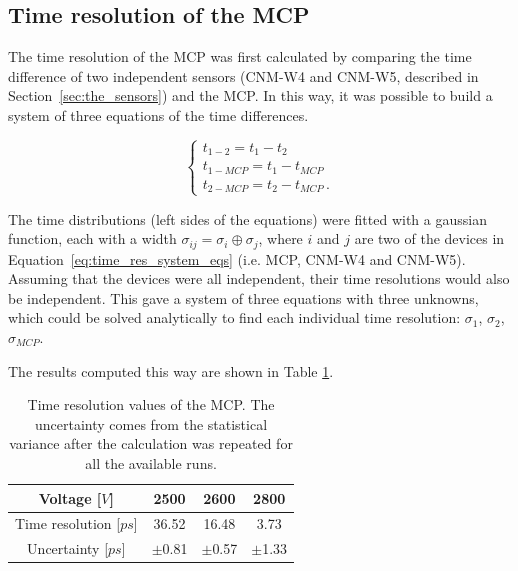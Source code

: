 \subsection{Time resolution of the MCP}
The time resolution of the MCP was first calculated by comparing the time difference of two independent sensors (CNM-W4 and CNM-W5, described in Section~\ref{sec:the_sensors}) and the MCP. In this way, it was possible to build a system of three equations of the time differences.

\begin{equation}\label{eq:time_res_system_eqs}
    \begin{cases}
        t_{1-2} = t_1 - t_2  \\
        t_{1-MCP} = t_1 - t_{MCP} \\
        t_{2-MCP} = t_2 - t_{MCP} \, .
    \end{cases}
\end{equation}

The time distributions (left sides of the equations) were fitted with a gaussian function, each with a width \(\sigma_{ij} = \sigma_i \oplus \sigma_j\), where \(i\) and \(j\) are two of the devices in Equation~\ref{eq:time_res_system_eqs} (i.e. MCP, CNM-W4 and CNM-W5). Assuming that the devices were all independent, their time resolutions would also be independent. This gave a system of three equations with three unknowns, which could be solved analytically to find each individual time resolution: \(\sigma_1\), \(\sigma_2\), \(\sigma_{MCP}\).

The results computed this way are shown in Table \ref{tab:MCP_time_resolution}.
\begin{table}[h!tbp]
    \begin{center}
        \captionsetup{width=\captionwidth}
        \caption{Time resolution values of the MCP. The uncertainty comes from the statistical variance after the calculation was repeated for all the available runs.}
        \label{tab:MCP_time_resolution}
        \begin{tabular}{ | c | c | c | c | }
            \hline
            Voltage [\(\si{V}\)] & 2500 & 2600 & 2800 \\ 
            \hline 
            Time resolution [\(\si{ps}\)] & 36.52 & 16.48 & 3.73 \\  
            Uncertainty [\(\si{ps}\)] & \(\pm\)0.81 & \(\pm\)0.57 & \(\pm\)1.33 \\
            \hline
        \end{tabular}
    \end{center}
\end{table}


